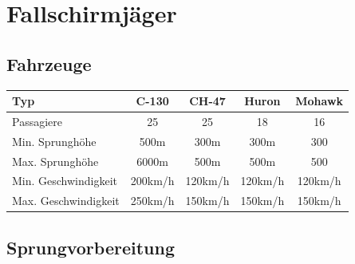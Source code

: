 \pagebreak
\section{Fallschirmjäger}

\subsection{Fahrzeuge}
\begin{longtable}{|l|c|c|c|c|} \hline
	Typ & C-130 & CH-47 &	Huron	&	Mohawk \\ \hline
	Passagiere 	&	25 	&	25 	&	18 	&	16 \\ \hline
	Min. Sprunghöhe	& 500m 	& 300m 	&	300m	&	300	\\ \hline
	Max. Sprunghöhe	&	6000m 	&	500m 	&	500m	&	500 \\ \hline
	Min. Geschwindigkeit	& 	200km/h	&	120km/h	&	120km/h	&	120km/h	\\ \hline
	Max. Geschwindigkeit	& 	250km/h	&	150km/h &	150km/h &	150km/h \\ \hline
\end{longtable}

\subsection{Sprungvorbereitung}
